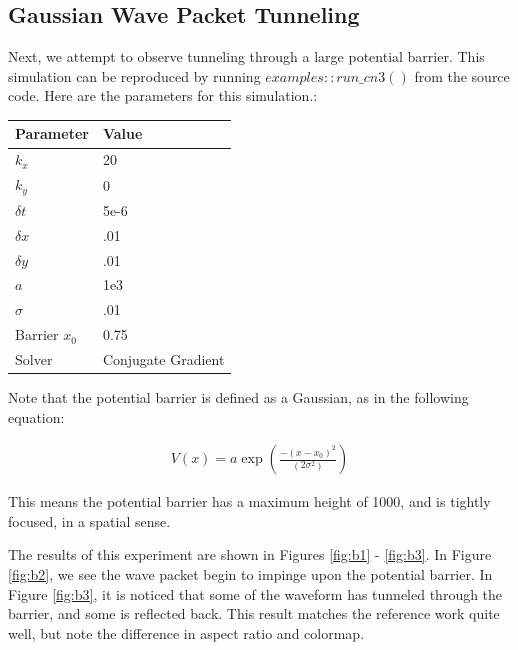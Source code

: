 \documentclass[letterpaper,12pt]{article}
\begin{document}
\newpage

\subsection{Gaussian Wave Packet Tunneling}

Next, we attempt to observe tunneling through a large potential barrier.  This simulation can be reproduced by running $examples::run\_cn3()$ from the source code. Here are the parameters for this simulation.:

\begin{center}
    \begin{tabular}{ | l | l  |}
    \hline
    Parameter & Value  \\ \hline
	$k_x$ & 20  \\ \hline
	$k_y$ & 0  \\ \hline    
	$\delta t$ & 5e-6  \\ \hline    
    $\delta x$ & .01  \\ \hline    
    $\delta y$ & .01  \\ \hline 
 	$a$ & 1e3  \\ \hline    
    $\sigma$ & .01  \\ \hline  
    Barrier $x_0$ & 0.75 \\ \hline            
    Solver & Conjugate Gradient  \\ \hline            
    \hline
    \end{tabular}
\end{center}

Note that the potential barrier is defined as a Gaussian, as in the following equation:

\begin{equation}
\begin{split}
V(x) = a\exp( \frac{-(x-x_0)^2}{(2\sigma^2)} )
\end{split}
\end{equation}

This means the potential barrier has a maximum height of 1000, and is tightly focused, in a spatial sense.

The results of this experiment are shown in Figures \ref{fig:b1} - \ref{fig:b3}.  In Figure \ref{fig:b2}, we see the wave packet begin to impinge upon the potential barrier.  In Figure \ref{fig:b3}, it is noticed that some of the waveform has tunneled through the barrier, and some is reflected back.  This result matches the reference work quite well, but note the difference in aspect ratio and colormap.
\end{document}
